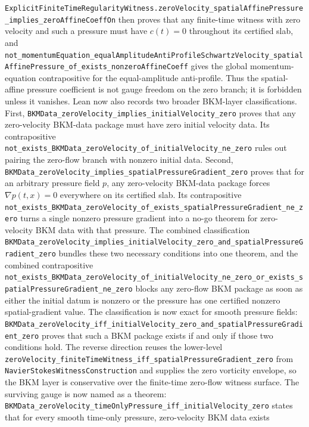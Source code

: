 \documentclass[11pt]{article}
\begin{document}
\texttt{ExplicitFiniteTimeRegularityWitness.zeroVelocity\_spatialAffinePressure\_implies\_zeroAffineCoeffOn}
then proves that any finite-time witness with zero velocity and such a pressure
must have \(c(t)=0\) throughout its certified slab, and
\texttt{not\_momentumEquation\_equalAmplitudeAntiProfileSchwartzVelocity\_spatialAffinePressure\_of\_exists\_nonzeroAffineCoeff}
gives the global momentum-equation contrapositive for the equal-amplitude
anti-profile.  Thus the spatial-affine pressure coefficient is not gauge freedom
on the zero branch; it is forbidden unless it vanishes.  Lean now also records
two broader BKM-layer classifications.  First,
\texttt{BKMData\_zeroVelocity\_implies\_initialVelocity\_zero} proves that any
zero-velocity BKM-data package must have zero initial velocity data.  Its
contrapositive
\texttt{not\_exists\_BKMData\_zeroVelocity\_of\_initialVelocity\_ne\_zero}
rules out pairing the zero-flow branch with nonzero initial data.  Second,
\texttt{BKMData\_zeroVelocity\_implies\_spatialPressureGradient\_zero} proves
that for an arbitrary pressure field \(p\), any zero-velocity BKM-data package
forces \(\nabla p(t,x)=0\) everywhere on its certified slab.  Its contrapositive
\texttt{not\_exists\_BKMData\_zeroVelocity\_of\_exists\_spatialPressureGradient\_ne\_zero}
turns a single nonzero pressure gradient into a no-go theorem for zero-velocity
BKM data with that pressure.  The combined classification
\texttt{BKMData\_zeroVelocity\_implies\_initialVelocity\_zero\_and\_spatialPressureGradient\_zero}
bundles these two necessary conditions into one theorem, and the combined
contrapositive
\texttt{not\_exists\_BKMData\_zeroVelocity\_of\_initialVelocity\_ne\_zero\_or\_exists\_spatialPressureGradient\_ne\_zero}
blocks any zero-flow BKM package as soon as either the initial datum is nonzero
or the pressure has one certified nonzero spatial-gradient value.  The
classification is now exact for smooth pressure fields:
\texttt{BKMData\_zeroVelocity\_iff\_initialVelocity\_zero\_and\_spatialPressureGradient\_zero}
proves that such a BKM package exists if and only if those two conditions hold.
The reverse direction reuses the lower-level
\texttt{zeroVelocity\_finiteTimeWitness\_iff\_spatialPressureGradient\_zero}
from \texttt{NavierStokesWitnessConstruction} and supplies the zero vorticity
envelope, so the BKM layer is conservative over the finite-time zero-flow
witness surface.  The surviving gauge is now named as a theorem:
\texttt{BKMData\_zeroVelocity\_timeOnlyPressure\_iff\_initialVelocity\_zero}
states that for every smooth time-only pressure, zero-velocity BKM data exists
\end{document}
